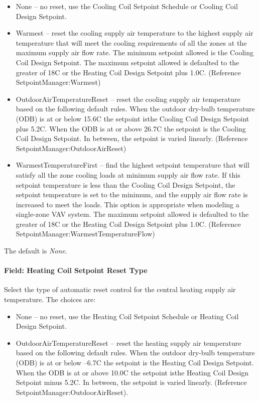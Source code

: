 \begin{itemize}
\item
  None -- no reset, use the Cooling Coil Setpoint Schedule or Cooling Coil Design Setpoint.
\item
  Warmest -- reset the cooling supply air temperature to the highest supply air temperature that will meet the cooling requirements of all the zones at the maximum supply air flow rate. The minimum setpoint allowed is the Cooling Coil Design Setpoint. The maximum setpoint allowed is defaulted to the greater of 18C or the Heating Coil Design Setpoint plus 1.0C. (Reference SetpointManager:Warmest)
\item
  OutdoorAirTemperatureReset -- reset the cooling supply air temperature based on the following default rules. When the outdoor dry-bulb temperature (ODB) is at or below 15.6C the setpoint isthe Cooling Coil Design Setpoint plus 5.2C. When the ODB is at or above 26.7C the setpoint is the Cooling Coil Design Setpoint. In between, the setpoint is varied linearly. (Reference SetpointManager:OutdoorAirReset)
\item
  WarmestTemperatureFirst -- find the highest setpoint temperature that will satisfy all the zone cooling loads at minimum supply air flow rate. If this setpoint temperature is less than the Cooling Coil Design Setpoint, the setpoint temperature is set to the minimum, and the supply air flow rate is increased to meet the loads. This option is appropriate when modeling a single-zone VAV system. The maximum setpoint allowed is defaulted to the greater of 18C or the Heating Coil Design Setpoint plus 1.0C. (Reference SetpointManager:WarmestTemperatureFlow)
\end{itemize}

The default is \emph{None}.

\paragraph{Field: Heating Coil Setpoint Reset Type}\label{field-heating-coil-setpoint-reset-type-1}

Select the type of automatic reset control for the central heating supply air temperature. The choices are:

\begin{itemize}
\item
  None -- no reset, use the Heating Coil Setpoint Schedule or Heating Coil Design Setpoint.
\item
  OutdoorAirTemperatureReset -- reset the heating supply air temperature based on the following default rules. When the outdoor dry-bulb temperature (ODB) is at or below --6.7C the setpoint is the Heating Coil Design Setpoint. When the ODB is at or above 10.0C the setpoint isthe Heating Coil Design Setpoint minus 5.2C. In between, the setpoint is varied linearly. (Reference SetpointManager:OutdoorAirReset).
\end{itemize}

